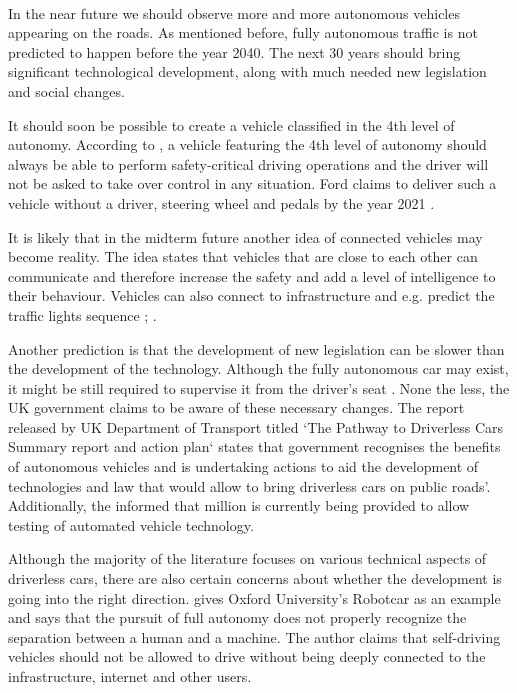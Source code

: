 \documentclass[11pt,english]{article}
\begin{document}
\paragraph{}
In the near future we should observe more and more autonomous vehicles appearing on the roads. As mentioned before, fully autonomous traffic is not predicted to happen before the year 2040. The next 30 years should bring significant technological development, along with much needed new legislation and social changes.
\par
It should soon be possible to create a vehicle classified in the 4th level of autonomy. According to \citet{nhtsa1}, a vehicle featuring the 4th level of autonomy should always be able to perform safety-critical driving operations and the driver will not be asked to take over control in any situation. Ford claims to deliver such a vehicle without a driver, steering wheel and pedals by the year 2021 \citep{ford1}.

\par


It is likely that in the midterm future another idea of connected vehicles may become reality. The idea states that vehicles that are close to each other can communicate and therefore increase the safety and add a level of intelligence to their behaviour. Vehicles can also connect to infrastructure and e.g. predict the traffic lights sequence \citep{narla2013evolution} ; \citep{luettel2012autonomous}.

\par
Another prediction is that the development of new legislation can be slower than the development of the technology. Although the fully autonomous car may exist, it might be still required to supervise it from the driver's seat \citep{luettel2012autonomous}. None the less, the UK government claims to be aware of these necessary changes. The report released by UK Department of Transport titled `The Pathway to Driverless Cars Summary report and action plan` \citep{pathwaytodriverless} states that government recognises the benefits of autonomous vehicles and is undertaking actions to aid the development of technologies and law that would allow to bring driverless cars on public roads'. Additionally, the \citet{pathwaytodriverless2} informed that  million is currently being provided  to allow testing of automated vehicle technology.

\par
Although the majority of the literature focuses on various technical aspects of driverless cars, there are also certain concerns about whether the development is going into the right direction. \citet{mcbride2016ethics} gives Oxford University’s Robotcar as an example and  says that the pursuit of full autonomy does not properly recognize the separation between a human and a machine. The author claims that self-driving vehicles should not be allowed to drive without being deeply connected to the infrastructure, internet and other users.
\end{document}
